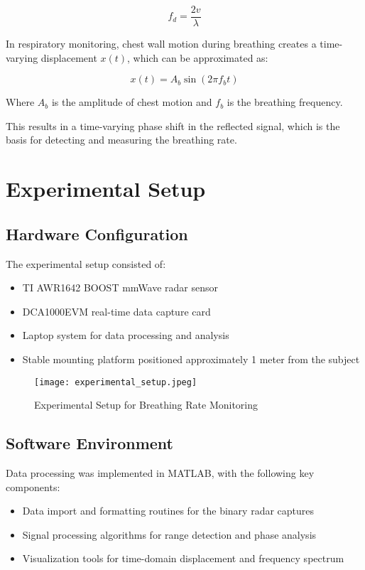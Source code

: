 \documentclass[12pt]{article}
\begin{document}
\begin{equation}
f_d = \frac{2v}{\lambda}
\end{equation}

In respiratory monitoring, chest wall motion during breathing creates a time-varying displacement $x(t)$, which can be approximated as:

\begin{equation}
x(t) = A_b \sin(2\pi f_b t)
\end{equation}

Where $A_b$ is the amplitude of chest motion and $f_b$ is the breathing frequency.

This results in a time-varying phase shift in the reflected signal, which is the basis for detecting and measuring the breathing rate.

\section{Experimental Setup}

\subsection{Hardware Configuration}
The experimental setup consisted of:

\begin{itemize}
    \item TI AWR1642 BOOST mmWave radar sensor
    \item DCA1000EVM real-time data capture card
    \item Laptop system for data processing and analysis
    \item Stable mounting platform positioned approximately 1 meter from the subject
\end{itemize}

\begin{figure}[H]
\centering
\texttt{[image: experimental\_setup.jpeg]} %
\caption{Experimental Setup for Breathing Rate Monitoring}
\end{figure}

\subsection{Software Environment}
Data processing was implemented in MATLAB, with the following key components:
\begin{itemize}
    \item Data import and formatting routines for the binary radar captures
    \item Signal processing algorithms for range detection and phase analysis
    \item Visualization tools for time-domain displacement and frequency spectrum
\end{itemize}
\end{document}
